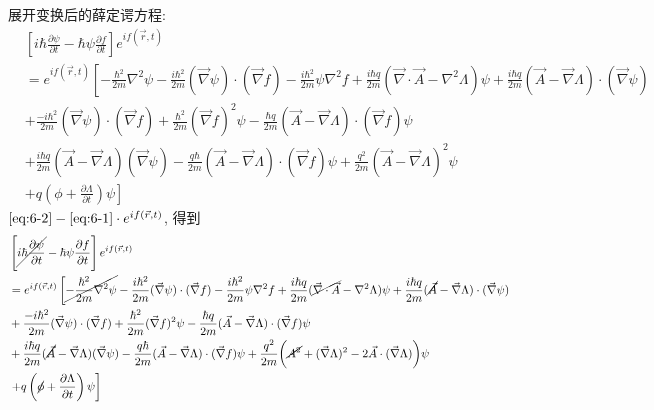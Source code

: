 \documentclass[../../main.tex]{subfiles}
\begin{document}
\begin{enumerate}
{{  展开变换后的薛定谔方程:
  \begin{align*}
    &\left[i\hbar\frac{\partial\psi}{\partial t} -\hbar\psi \frac{\partial f}{\partial t}\right]e^{if(\vec{r},t)} \\
    &= e^{if(\vec{r},t)}\left[-\frac{\hbar^{2}}{2m}\nabla^{2}\psi - \frac{i\hbar^{2}}{2m}(\vec{\nabla}\psi)\cdot(\vec{\nabla}f) -\frac{i\hbar^{2}}{2m}\psi\nabla^{2}f + \frac{i\hbar q}{2m}(\vec{\nabla}\cdot\vec{A} - \nabla^{2}\Lambda)\psi + \frac{i\hbar q}{2m}(\vec{A}-\vec{\nabla}\Lambda)\cdot(\vec{\nabla}\psi)\right.\\
     &+ \frac{-i\hbar^{2}}{2m}(\vec{\nabla}\psi)\cdot(\vec{\nabla}f) + \frac{\hbar^{2}}{2m}(\vec{\nabla}f)^{2}\psi - \frac{\hbar q}{2m}(\vec{A} - \vec{\nabla}\Lambda)\cdot(\vec{\nabla}f)\psi\\
     &+ \frac{i\hbar q}{2m}(\vec{A}-\vec{\nabla}\Lambda)(\vec{\nabla}\psi) - \frac{q\hbar}{2m}(\vec{A}-\vec{\nabla}\Lambda)\cdot(\vec{\nabla}f)\psi + \frac{q^{2}}{2m}(\vec{A} - \vec{\nabla}\Lambda)^{2}\psi\\
     &\left.+ q\left(\phi + \frac{\partial\Lambda}{\partial t}\right)\psi\right]\label{eq:6-2}\tag{②}
  \end{align*}
  $\eqref{eq:6-2} - \eqref{eq:6-1}\cdot e^{if(\vec{r},t)}$, 得到
  \begin{align*}
    &\left[\cancel{i\hbar\frac{\partial\psi}{\partial t}} -\hbar\psi \frac{\partial f}{\partial t}\right]e^{if(\vec{r},t)} \\
    &= e^{if(\vec{r},t)}\left[
      \cancel{-\frac{\hbar^{2}}{2m}\nabla^{2}\psi} - \frac{i\hbar^{2}}{2m}(\vec{\nabla}\psi)\cdot(\vec{\nabla}f) - \frac{i\hbar^{2}}{2m}\psi\nabla^{2}f + \frac{i\hbar q}{2m}(\cancel{\vec{\nabla}\cdot\vec{A}} - \nabla^{2}\Lambda)\psi + \frac{i\hbar q}{2m}(\cancel{\vec{A}}-\vec{\nabla}\Lambda)\cdot(\vec{\nabla}\psi)
      \right.\\
    &+ \frac{-i\hbar^{2}}{2m}(\vec{\nabla}\psi)\cdot(\vec{\nabla}f) + \frac{\hbar^{2}}{2m}(\vec{\nabla}f)^{2}\psi - \frac{\hbar q}{2m}(\vec{A} - \vec{\nabla}\Lambda)\cdot(\vec{\nabla}f)\psi\\
    &+ \frac{i\hbar q}{2m}(\cancel{\vec{A}}-\vec{\nabla}\Lambda)(\vec{\nabla}\psi) - \frac{q\hbar}{2m}(\vec{A}-\vec{\nabla}\Lambda)\cdot(\vec{\nabla}f)\psi + \frac{q^{2}}{2m}\bigg(\cancel{A^{2}} + (\vec{\nabla}\Lambda)^{2} - 2\vec{A}\cdot(\vec{\nabla}\Lambda)\bigg)\psi\\
    &\left.+ q\left(\cancel{\phi} + \frac{\partial\Lambda}{\partial t}\right)\psi\right]\\

\end{align*}}}
\end{enumerate}
\end{document}
